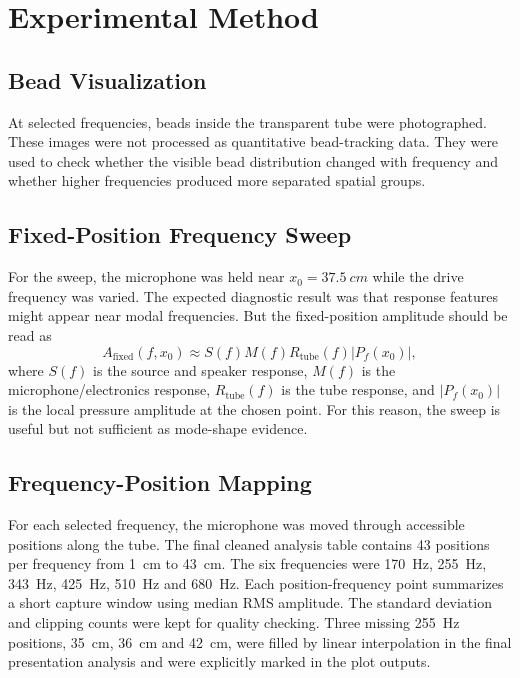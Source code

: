 \documentclass[11pt,a4paper]{article}
\newcommand{\fixedamp}{A_{\mathrm{fixed}}}
\begin{document}
\section{Experimental Method}

\subsection{Bead Visualization}

At selected frequencies, beads inside the transparent tube were photographed. These images were not processed as quantitative bead-tracking data. They were used to check whether the visible bead distribution changed with frequency and whether higher frequencies produced more separated spatial groups.

\subsection{Fixed-Position Frequency Sweep}

For the sweep, the microphone was held near \(x_0=\SI{37.5}{cm}\) while the drive frequency was varied. The expected diagnostic result was that response features might appear near modal frequencies. But the fixed-position amplitude should be read as
\begin{equation}
  \fixedamp(f,x_0)\approx S(f)M(f)R_{\mathrm{tube}}(f)\left|P_f(x_0)\right|,
\end{equation}
where \(S(f)\) is the source and speaker response, \(M(f)\) is the microphone/electronics response, \(R_{\mathrm{tube}}(f)\) is the tube response, and \(\left|P_f(x_0)\right|\) is the local pressure amplitude at the chosen point. For this reason, the sweep is useful but not sufficient as mode-shape evidence.

\subsection{Frequency-Position Mapping}

For each selected frequency, the microphone was moved through accessible positions along the tube. The final cleaned analysis table contains 43 positions per frequency from \SI{1}{cm} to \SI{43}{cm}. The six frequencies were \SI{170}{Hz}, \SI{255}{Hz}, \SI{343}{Hz}, \SI{425}{Hz}, \SI{510}{Hz} and \SI{680}{Hz}. Each position-frequency point summarizes a short capture window using median RMS amplitude. The standard deviation and clipping counts were kept for quality checking. Three missing \SI{255}{Hz} positions, \SI{35}{cm}, \SI{36}{cm} and \SI{42}{cm}, were filled by linear interpolation in the final presentation analysis and were explicitly marked in the plot outputs.
\end{document}
